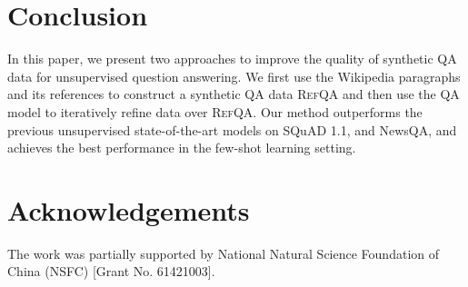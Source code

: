 \documentclass[11pt,a4paper]{article}
\newcommand\refqa{\textsc{RefQA}}
\begin{document}
\section{Conclusion}

In this paper, we present two approaches to improve the quality of synthetic QA data for unsupervised question answering. We first use the Wikipedia paragraphs and its references to construct a synthetic QA data \refqa{} and then use the QA model to iteratively refine data over \refqa{}. Our method outperforms the previous unsupervised state-of-the-art models on SQuAD 1.1, and NewsQA, and achieves the best performance in the few-shot learning setting. 



\section*{Acknowledgements}
The work was partially supported by National Natural Science Foundation of China (NSFC) [Grant No. 61421003].




\end{document}
